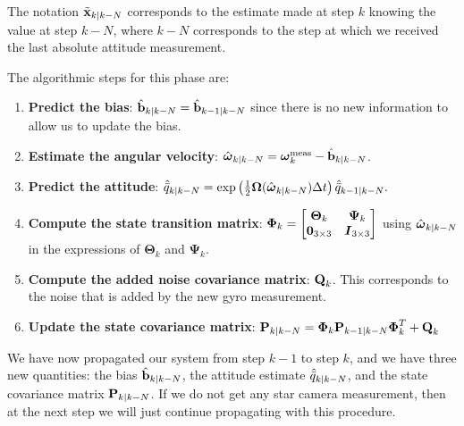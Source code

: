 The notation $\tilde{\textrm{\textbf{x}}}_{k|k-N}$ corresponds to the estimate made at step $k$ knowing the value at step $k-N$, where $k-N$ corresponds to the step at which we received the last absolute attitude measurement. 

The algorithmic steps for this phase are:
\begin{enumerate}
\item \textbf{Predict the bias}: $\hat{\textrm{\textbf{b}}}_{k|k-N} = \hat{\textrm{\textbf{b}}}_{k-1|k-N}$ since there is no new information to allow us to update the bias.
\item \textbf{Estimate the angular velocity}: $\hat{\boldsymbol\omega}_{k|k-N} = \boldsymbol\omega_k^{\textrm{meas}} - \hat{\textrm{\textbf{b}}}_{k|k-N}$.
\item \textbf{Predict the attitude}: $\hat{\bar{q}}_{k|k-N} = \exp\left(\frac{1}{2}\boldsymbol\Omega(\hat{\boldsymbol\omega}_{k|k-N})\Delta t\right)\hat{\bar{q}}_{k-1|k-N}.$
\item \textbf{Compute the state transition matrix}: $\boldsymbol{\Phi}_k = \begin{bmatrix} \boldsymbol{\Theta}_k & \boldsymbol{\Psi}_k \\ \boldsymbol{0}_{3\times 3} & \boldsymbol{I}_{3\times 3}\end{bmatrix}$ using $\hat{\boldsymbol\omega}_{k|k-N}$ in the expressions of $\boldsymbol{\Theta}_k$ and $\boldsymbol{\Psi}_k$.
\item \textbf{Compute the added noise covariance matrix}: $\textrm{\textbf{Q}}_k$. This corresponds to the noise that is added by the new gyro measurement.
\item \textbf{Update the state covariance matrix}: $\textrm{\textbf{P}}_{k|k-N}  =   \boldsymbol{\Phi}_k \textrm{\textbf{P}}_{k-1|k-N}\boldsymbol{\Phi}^T_k + \textrm{\textbf{Q}}_k$
\end{enumerate}
We have now propagated our system from step $k-1$ to step $k$, and we have three new quantities: the bias $\hat{\textrm{\textbf{b}}}_{k|k-N}$, the attitude estimate $\hat{\bar{q}}_{k|k-N}$, and the state covariance matrix $\textrm{\textbf{P}}_{k|k-N} $. If we do not get any star camera measurement, then at the next step we will just continue propagating with this procedure.

